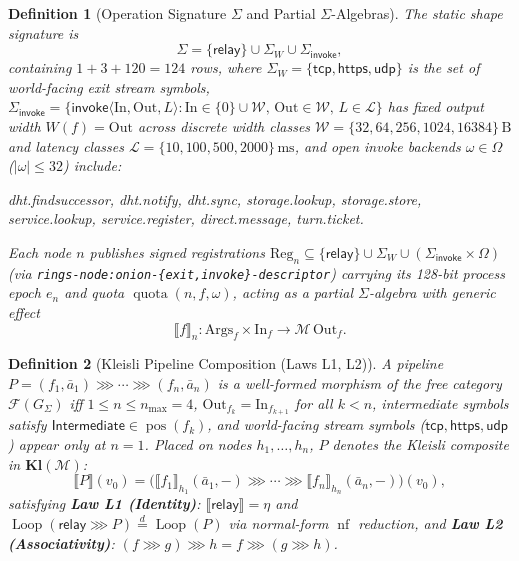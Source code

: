 \documentclass[journal]{IEEEtran}
\newtheorem{definition}{Definition}
\DeclareRobustCommand{\code}[1]{{\ttfamily\renewcommand{\_}{\textunderscore\allowbreak}#1}}
\begin{document}
\begin{definition}[Operation Signature $\Sigma$ and Partial $\Sigma$-Algebras]\label{def:onion-signature}
The static shape signature is
\[
  \Sigma=\{\mathsf{relay}\}\cup\Sigma_W\cup\Sigma_{\mathsf{invoke}},
\]
containing $1+3+120=124$ rows, where $\Sigma_W=\{\mathsf{tcp},\mathsf{https},\mathsf{udp}\}$ is the set of world-facing exit stream symbols, $\Sigma_{\mathsf{invoke}}=\{\mathsf{invoke}\langle\mathrm{In},\mathrm{Out},L\rangle:\mathrm{In}\in\{0\}\cup\mathcal{W},\,\mathrm{Out}\in\mathcal{W},\,L\in\mathcal{L}\}$ has fixed output width $W(f)=\mathrm{Out}$ across discrete width classes $\mathcal{W}=\{32,64,256,1024,16384\}\,\mathrm{B}$ and latency classes $\mathcal{L}=\{10,100,500,2000\}\,\mathrm{ms}$, and open invoke backends $\omega\in\Omega$ ($|\omega|\le 32$) include:
\begin{center}
\footnotesize
\code{dht.find\_successor}, \code{dht.notify}, \code{dht.sync},
\code{storage.lookup}, \code{storage.store}, \code{service.lookup},
\code{service.register}, \code{direct.message}, \code{turn.ticket}.
\end{center}
Each node $n$ publishes signed registrations $\mathrm{Reg}_n\subseteq\{\mathsf{relay}\}\cup\Sigma_W\cup(\Sigma_{\mathsf{invoke}}\times\Omega)$ (via \texttt{rings-node:onion-\{exit,invoke\}-descriptor}) carrying its 128-bit process epoch $e_n$ and quota $\operatorname{quota}(n,f,\omega)$, acting as a partial $\Sigma$-algebra with generic effect~\cite{Plotkin2003,Plotkin2009}
\[
  \llbracket f\rrbracket_n:\mathrm{Args}_f\times\mathrm{In}_f\to \mathcal{M}\,\mathrm{Out}_f.
\]
\end{definition}

\begin{definition}[Kleisli Pipeline Composition (Laws L1, L2)]\label{def:kleisli-pipeline}
A pipeline $P=(f_1,\bar{a}_1)\mathbin{\ggg}\cdots\mathbin{\ggg}(f_n,\bar{a}_n)$
is a well-formed morphism of the free category $\mathcal{F}(G_\Sigma)$ iff
$1\le n\le n_{\max}=4$, $\mathrm{Out}_{f_k}=\mathrm{In}_{f_{k+1}}$ for all
$k<n$, intermediate symbols satisfy $\mathsf{Intermediate}\in\operatorname{pos}(f_k)$,
and world-facing stream symbols ($\mathsf{tcp},\mathsf{https},\mathsf{udp}$) appear only at
$n=1$.  Placed on nodes $h_1,\dots,h_n$, $P$ denotes the Kleisli composite in
$\mathbf{Kl}(\mathcal{M})$:
\[
  \llbracket P\rrbracket(v_0)=
  \bigl(\llbracket f_1\rrbracket_{h_1}(\bar{a}_1,-)\mathbin{\ggg}\cdots\mathbin{\ggg}
  \llbracket f_n\rrbracket_{h_n}(\bar{a}_n,-)\bigr)(v_0),
\]
satisfying \textbf{Law L1 (Identity)}: $\llbracket\mathsf{relay}\rrbracket=\eta$ and
$\operatorname{Loop}(\mathsf{relay}\mathbin{\ggg}P)\overset{d}{=}\operatorname{Loop}(P)$
via normal-form $\operatorname{nf}$ reduction, and \textbf{Law L2 (Associativity)}:
$(f\mathbin{\ggg}g)\mathbin{\ggg}h=f\mathbin{\ggg}(g\mathbin{\ggg}h)$.
\end{definition}
\end{document}
